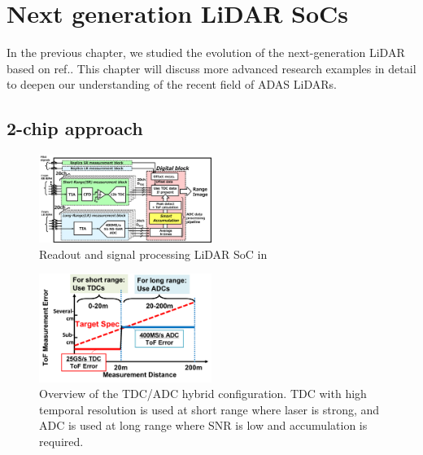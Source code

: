 \documentclass[paper]{ieice}
\begin{document}

\section{Next generation LiDAR SoCs}
\qquad In the previous chapter, we studied the evolution of the next-generation LiDAR based on ref.\cite{niclass2012100}. This chapter will discuss more advanced research examples in detail to deepen our understanding of the recent field of ADAS LiDARs.

\subsection{2-chip approach}
\begin{figure}[!t]
\centering
 \includegraphics[width=0.5\textwidth]{figs/toshibasoc.png}
  \caption{Readout and signal processing LiDAR SoC in \cite{yoshioka201820}}
\label{rxchip}
\end{figure}

\begin{figure}[!t]
\centering
 \includegraphics[width=0.5\textwidth]{figs/tdcadc.png}
  \caption{Overview of the TDC/ADC hybrid configuration. TDC with high temporal resolution is used at short range where laser is strong, and ADC is used at long range where SNR is low and accumulation is required.}
\label{tdcadc}
\end{figure}
\end{document}
